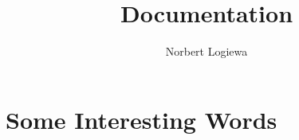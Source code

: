\documentclass[a4paper, 13pt, twocolumn, draft]{article}
\author{Norbert Logiewa}
\title{Documentation}
\begin{document}
\maketitle

\section*{Some Interesting Words}
\end{document}
